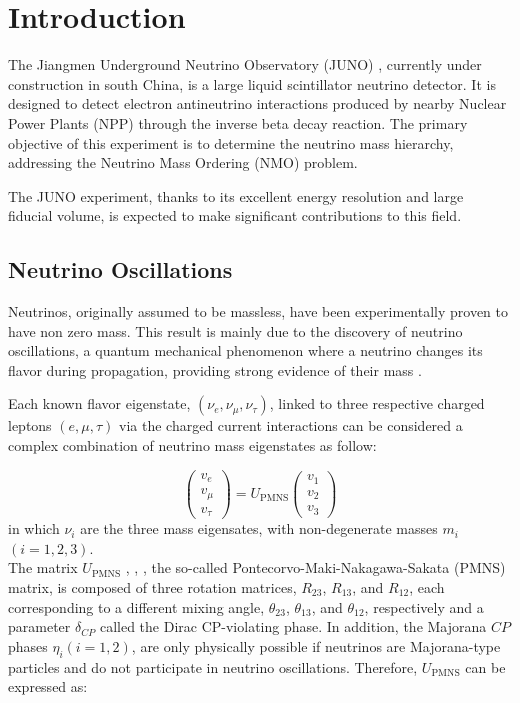 \chapter{Introduction}

The Jiangmen Underground Neutrino Observatory (JUNO) \cite{JUNOdet}, currently under construction in south China, is a large liquid scintillator neutrino detector. It is designed to detect electron antineutrino interactions produced by nearby Nuclear Power Plants (NPP) through the inverse beta decay reaction. The primary objective of this experiment is to determine the neutrino mass hierarchy, addressing the Neutrino Mass Ordering (NMO) problem.

The JUNO experiment, thanks to its excellent energy resolution and large fiducial volume, is expected to make significant contributions to this field.

\section{Neutrino Oscillations}
Neutrinos, originally assumed to be massless, have been experimentally proven to have non zero mass. This result is mainly due to the discovery of neutrino oscillations, a quantum mechanical phenomenon where a neutrino changes its flavor during propagation, providing strong evidence of their mass \cite{dim_osci_neut}.

Each known flavor eigenstate, $(\nu_e,\nu_{\mu},\nu_{\tau})$, linked to three respective charged leptons $(e,\mu,\tau)$  via the charged current interactions can be considered a complex combination of neutrino mass eigenstates as follow:

\begin{equation*}
	\left(\begin{array}{l}
		v_e \\
		v_\mu \\
		v_\tau
	\end{array}\right)=U_{\mathrm{PMNS}}\left(\begin{array}{l}
		v_1 \\
		v_2 \\
		v_3
	\end{array}\right)
\end{equation*}
in which $\nu_i$ are the three mass eigensates, with non-degenerate masses  $m_i$  $(i = 1,2,3)$.\\

The matrix $U_{\mathrm{PMNS}}$ \cite{matrix_1}, \cite{matrix_2}, \cite{matrix_3}, the so-called Pontecorvo-Maki-Nakagawa-Sakata (PMNS) matrix, is composed of three rotation matrices, $R_{23}$, $R_{13}$, and $R_{12}$, each corresponding to a different mixing angle, $\theta_{23}$, $\theta_{13}$, and $\theta_{12}$, respectively and a parameter $\delta_{CP}$ called the Dirac CP-violating phase. In addition, the Majorana $C P$ phases $\eta_i(i=1,2)$, are only physically possible if neutrinos are Majorana-type particles and do not participate in neutrino oscillations. Therefore, $U_{\mathrm{PMNS}}$ can be expressed as:

